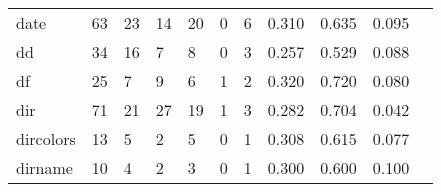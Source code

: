 \begin{longtable}{lp{1.2cm}p{1.2cm}p{1.2cm}p{1.2cm}p{1.2cm}p{1.2cm}p{1.2cm}p{1.2cm}p{1.2cm}p{1.2cm}}
date      &                                    63 &                                                 23 &                                                 14 &                                                 20 &                                                  0 &                                                  6 &                                              0.310 &                                              0.635 &                                              0.095 \\
dd        &                                    34 &                                                 16 &                                                  7 &                                                  8 &                                                  0 &                                                  3 &                                              0.257 &                                              0.529 &                                              0.088 \\
df        &                                    25 &                                                  7 &                                                  9 &                                                  6 &                                                  1 &                                                  2 &                                              0.320 &                                              0.720 &                                              0.080 \\
dir       &                                    71 &                                                 21 &                                                 27 &                                                 19 &                                                  1 &                                                  3 &                                              0.282 &                                              0.704 &                                              0.042 \\
dircolors &                                    13 &                                                  5 &                                                  2 &                                                  5 &                                                  0 &                                                  1 &                                              0.308 &                                              0.615 &                                              0.077 \\
dirname   &                                    10 &                                                  4 &                                                  2 &                                                  3 &                                                  0 &                                                  1 &                                              0.300 &                                              0.600 &                                              0.100 \\

\end{longtable}
